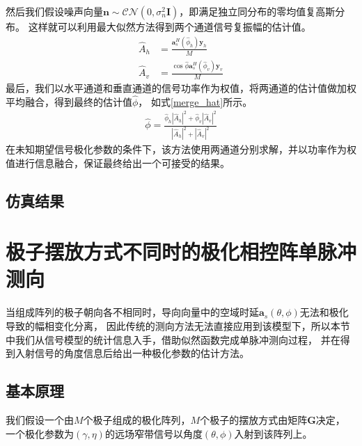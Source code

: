 \documentclass[master]{thesis-uestc}
\begin{document}
然后我们假设噪声向量$\bm{n}\sim\mathcal{CN}(0,\sigma_n^2\bm{I})$，即满足独立同分布的零均值复高斯分布。
这样就可以利用最大似然方法得到两个通道信号复振幅的估计值\cite{Ma}。
\begin{subequations}\label{dual_amp_hat}
    \begin{align}
        \hat{A}_h &= \frac{\bm{a}_s^H(\hat{\phi}_h)\bm{y}_h}{M} \\
        \hat{A}_v &= \frac{\cos\hat{\phi}\bm{a}_s^H(\hat{\phi}_v)\bm{y}_v}{M}
    \end{align}
\end{subequations}
最后，我们以水平通道和垂直通道的信号功率作为权值，将两通道的估计值做加权平均融合，得到最终的估计值$\hat{\phi}$，
如式\eqref{merge_hat}所示。
\begin{equation}\label{merge_hat}
    \begin{aligned}
        \hat{\phi} = 
        \frac{\hat{\phi}_h\left|\hat{A}_h\right|^2+\hat{\phi}_v\left|\hat{A}_v\right|^2}
        {\left|\hat{A}_h\right|^2+\left|\hat{A}_v\right|^2}
    \end{aligned}
\end{equation}
在未知期望信号极化参数的条件下，该方法使用两通道分别求解，并以功率作为权值进行信息融合，保证最终给出一个可接受的结果。

\subsection{仿真结果}

\section{极子摆放方式不同时的极化相控阵单脉冲测向}
当组成阵列的极子朝向各不相同时，导向向量中的空域时延$\bm{a}_s(\theta,\phi)$无法和极化导致的幅相变化分离，
因此传统的测向方法无法直接应用到该模型下，所以本节中我们从信号模型的统计信息入手，借助似然函数完成单脉冲测向过程，
并在得到入射信号的角度信息后给出一种极化参数的估计方法。

\subsection{基本原理}
我们假设一个由$M$个极子组成的极化阵列，$M$个极子的摆放方式由矩阵$\bm{G}$决定，
一个极化参数为$(\gamma,\eta)$的远场窄带信号以角度$(\theta,\phi)$入射到该阵列上。
\end{document}
